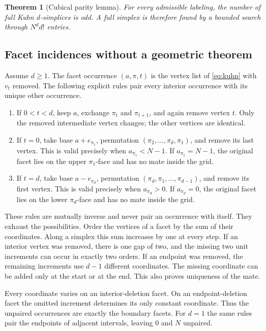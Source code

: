 \documentclass[11pt,a4paper]{article}
\newtheorem{theorem}{Theorem}[section]
\theoremstyle{definition}
\begin{document}
\begin{theorem}[Cubical parity lemma]\label{thm:sperner}
For every admissible labeling, the number of full Kuhn $d$-simplices
is odd. A full simplex is therefore found by a bounded search
through $N^d d!$ entries.
\end{theorem}

\subsection{Facet incidences without a geometric theorem}
Assume $d\geq1$. The facet occurrence $(a,\pi,t)$ is the vertex list of
\eqref{eq:kuhn} with $v_t$ removed. The following explicit rules pair
every interior occurrence with its unique other occurrence.
\begin{enumerate}
\item If $0<t<d$, keep $a$, exchange $\pi_t$ and $\pi_{t+1}$,
and again remove vertex $t$. Only the removed intermediate vertex
changes; the other vertices are identical.
\item If $t=0$, take base $a+e_{\pi_1}$, permutation
$(\pi_2,\ldots,\pi_d,\pi_1)$, and remove its last vertex.
This is valid precisely when $a_{\pi_1}<N-1$.
If $a_{\pi_1}=N-1$, the original facet lies on the upper
$\pi_1$-face and has no mate inside the grid.
\item If $t=d$, take base $a-e_{\pi_d}$, permutation
$(\pi_d,\pi_1,\ldots,\pi_{d-1})$, and remove its first vertex.
This is valid precisely when $a_{\pi_d}>0$.
If $a_{\pi_d}=0$, the original facet lies on the lower
$\pi_d$-face and has no mate inside the grid.
\end{enumerate}
These rules are mutually inverse and never pair an occurrence with
itself. They exhaust the possibilities. Order the vertices of a
facet by the sum of their coordinates. Along a simplex this sum
increases by one at every step. If an interior vertex was removed,
there is one gap of two, and the missing two unit increments can
occur in exactly two orders. If an endpoint was removed, the
remaining increments use $d-1$ different coordinates. The missing
coordinate can be added only at the start or at the end.
This also proves uniqueness of the mate.

Every coordinate varies on an interior-deletion facet. On an
endpoint-deletion facet the omitted increment determines its
only constant coordinate. Thus the unpaired occurrences are exactly
the boundary facets. For $d=1$ the same rules pair the endpoints of
adjacent intervals, leaving $0$ and $N$ unpaired.
\end{document}
